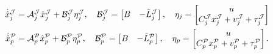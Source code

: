 \begin{equation}\label{eqn:ssmo-standard-system-form}
    \begin{split}
        \dot{\hat{x}}_{j}^{\mathcal{J}} &= \mathcal{A}_{j}^{\mathcal{J}}\hat{x}_{j}^{\mathcal{J}} + \mathcal{B}_{j}^{\mathcal{J}}\eta_{j}^{\mathcal{J}}, \quad
        \mathcal{B}_{j}^{\mathcal{J}} =
        \begin{bmatrix}
            B & -\Tilde{L}_{j}^{\mathcal{J}} \\
        \end{bmatrix}, \quad \eta_j =
        \begin{bmatrix}
            u \\
            C_{j}^{\mathcal{J}}x_{j}^{\mathcal{J}} + v_{j}^{\mathcal{J}} + \tau_{j}^{\mathcal{J}}
        \end{bmatrix} \\ 
        \dot{\hat{x}}_{p}^{\mathcal{P}} &= \mathcal{A}_{p}^{\mathcal{P}}\hat{x}_{p}^{\mathcal{P}} + \mathcal{B}_{p}^{\mathcal{P}}\eta_{p}^{\mathcal{P}}, \quad
        \mathcal{B}_{p}^{\mathcal{P}} =
        \begin{bmatrix}
            B & -\Tilde{L}_{p}^{\mathcal{P}} \\
        \end{bmatrix}, \quad \eta_p =
        \begin{bmatrix}
            u \\
            C_{p}^{\mathcal{P}}x_{p}^{\mathcal{P}} + v_{p}^{\mathcal{P}} + \tau_{p}^{\mathcal{P}}
        \end{bmatrix}.
    \end{split}
\end{equation}

